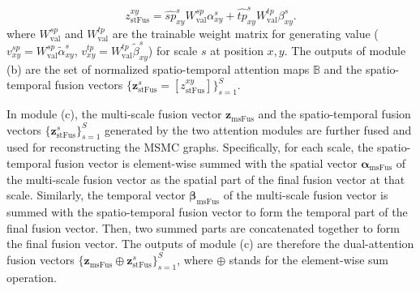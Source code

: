 \documentclass[journal]{IEEEtran}
\begin{document}
\begin{equation}
z_{\mathrm{stFus}}^{xy} = 
{\hat{sp}_{xy}^{s}} W_{\mathrm{val}}^{sp} {\alpha_{xy}^{s}} + {\hat{tp}_{xy}^{s}} W_{\mathrm{val}}^{tp} {\beta_{xy}^{s}}.
\end{equation}
where $ W_{\mathrm{val}}^{sp} $ and $ W_{\mathrm{val}}^{tp} $ are the trainable weight matrix for generating value ($v^{sp}_{xy} = W_{\mathrm{val}}^{sp}  \tilde{\alpha}_{xy}^{s}$, $v^{tp}_{xy} = W_{\mathrm{val}}^{tp}  \tilde{\beta}_{xy}^{s}$) for scale $s$ at position $x,y$. 
The outputs of module (b) are the set of normalized spatio-temporal attention maps $\mathbb{B}$ and the spatio-temporal fusion vectors $\{ \mathbf{z}_{\mathrm{stFus}}^{s} = \left [ {z}^{xy}_{\mathrm{stFus}}\right ] \}^S_{s=1}$.

In module (c), the multi-scale fusion vector $\mathbf{z}_{\mathrm{msFus}}^{}$ and the spatio-temporal fusion vectors $\{ \mathbf{z}_{\mathrm{stFus}}^{s} \}^S_{s=1}$ generated by the two attention modules are further fused and used for reconstructing the MSMC graphs.
Specifically, for each scale, the spatio-temporal fusion vector is element-wise summed with the spatial vector $\mathbf{\alpha}_{\mathrm{msFus}} $ of the multi-scale fusion vector as the spatial part of the final fusion vector at that scale. Similarly, the temporal vector $\mathbf{\beta}_{\mathrm{msFus}}$ of the multi-scale fusion vector is summed with the spatio-temporal fusion vector to form the temporal part of the final fusion vector. Then, two summed parts are concatenated together to form the final fusion vector.
The outputs of module (c) are therefore the dual-attention fusion vectors $ \{\mathbf{z}_{\mathrm{msFus}}^{} \oplus \mathbf{z}_{\mathrm{stFus}}^s\}_{s=1}^{S}$, where $\oplus$ stands for the element-wise sum operation.
\end{document}
